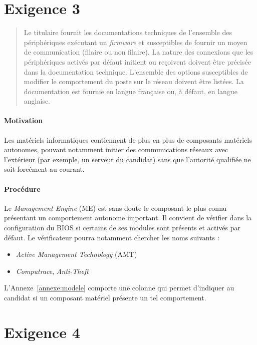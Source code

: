 \documentclass{report}
\begin{document}
\section{Exigence 3}

\begin{quote}
  Le titulaire fournit les documentations techniques de l’ensemble des
  périphériques exécutant un \emph{firmware} et susceptibles de fournir un moyen
  de communication (filaire ou non filaire).
  La nature des connexions que les périphériques activés par défaut initient ou
  reçoivent doivent être précisée dans la documentation technique.
  L’ensemble des options susceptibles de modifier le comportement du poste sur
  le réseau doivent être listées.
  La documentation est fournie en langue française ou, à défaut, en langue
  anglaise.
\end{quote}

\paragraph{Motivation}
%
Les matériels informatiques contiennent de plus en plus de composants matériels
autonomes, pouvant notamment initier des communications réseaux avec l’extérieur
(par exemple, un serveur du candidat) sans que l’autorité qualifiée ne soit
forcément au courant.

\paragraph{Procédure}
%
Le \emph{Management Engine} (ME) est sans doute le composant le plus connu
présentant un comportement autonome important.
%
Il convient de vérifier dans la configuration du BIOS si certains de ses modules
sont présents et activés par défaut.
%
Le vérificateur pourra notamment chercher les noms suivants :

\begin{itemize}
\item \emph{Active Management Technology} (AMT)
\item \emph{Computrace}, \emph{Anti-Theft}
\end{itemize}

L’Annexe~\ref{annexe:modele} comporte une colonne qui permet d’indiquer au
candidat si un composant matériel présente un tel comportement.

\section{Exigence 4}
\end{document}
